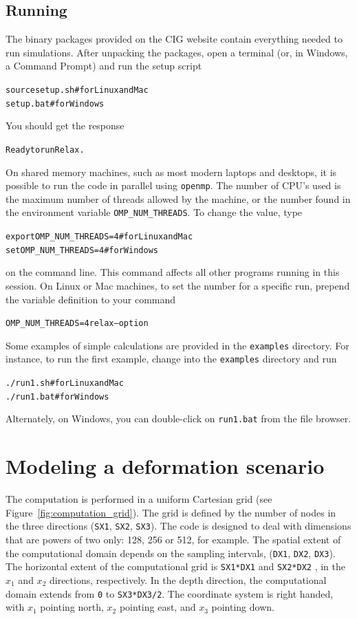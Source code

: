 \documentclass[10pt]{article}
\begin{document}
\subsection{Running}


The binary packages provided on the CIG website contain everything
needed to run simulations.  After unpacking the packages, open a
terminal (or, in Windows, a Command Prompt) and run the setup script
\begin{alltt}
{\color{orange}source setup.sh # for Linux and Mac}
{\color{orange}setup.bat       # for Windows}
\end{alltt}
You should get the response
\begin{alltt}
{\color{NavyBlue}Ready to run Relax.}
\end{alltt}

On shared memory machines, such as most modern laptops and desktops, it is possible to run the code in parallel using \verb'openmp'. The number of CPU's used is the maximum number of threads allowed by the machine, or the number found in the environment variable \verb'OMP_NUM_THREADS'. To change the value, type
\begin{alltt}
{\color{orange}export OMP_NUM_THREADS=4 # for Linux and Mac}
{\color{orange}set OMP_NUM_THREADS=4    # for Windows}
\end{alltt}
on the command line. This command affects all other programs running
in this session. On Linux or Mac machines, to set the number for a
specific run, prepend the variable definition to your command
\begin{alltt}
{\color{orange}OMP_NUM_THREADS=4 relax --option}
\end{alltt}

Some examples of simple calculations are provided in the \verb'examples' directory. For instance, to run the first example, change into the \verb'examples' directory and run
\begin{alltt}
{\color{orange}./run1.sh  # for Linux and Mac }
{\color{orange}./run1.bat # for Windows }
\end{alltt}
Alternately, on Windows, you can double-click on \verb'run1.bat' from the file browser.

\section{Modeling a deformation scenario}

The computation is performed in a uniform Cartesian grid (see Figure~\ref{fig:computation_grid}). The grid is defined by the number of nodes in the three directions (\verb'SX1', \verb'SX2', \verb'SX3'). The code is designed to deal with dimensions that are powers of two only: 128, 256 or 512, for example. The spatial extent of the computational domain depends on the sampling intervals, (\verb'DX1', \verb'DX2', \verb'DX3'). The horizontal extent of the computational grid is \verb'SX1*DX1' and \verb'SX2*DX2' , in the $x_1$ and $x_2$ directions, respectively. In the depth direction, the computational domain extends from \verb'0' to \verb'SX3*DX3/2'. The coordinate system is right handed, with $x_1$ pointing north, $x_2$ pointing east, and $x_3$ pointing down. 
\end{document}
